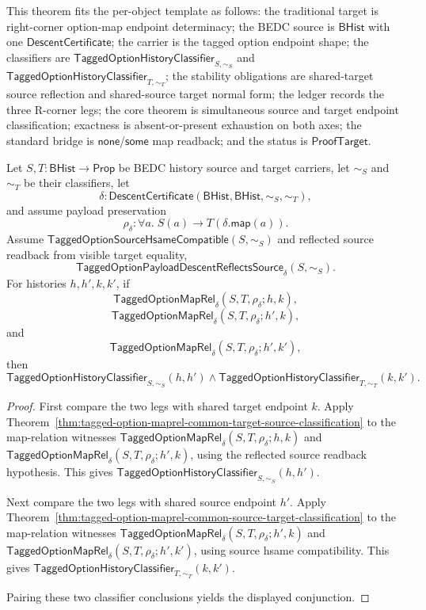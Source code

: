 \begin{theorem}
\label{thm:tagged-option-maprel-r-corner-classifier-coherence}
This theorem fits the per-object template as follows: the traditional target is
right-corner option-map endpoint determinacy; the BEDC source is
$\mathsf{BHist}$ with one $\mathsf{DescentCertificate}$; the carrier is the
tagged option endpoint shape; the classifiers are
$\mathsf{TaggedOptionHistoryClassifier}_{S,\sim_S}$ and
$\mathsf{TaggedOptionHistoryClassifier}_{T,\sim_T}$; the stability obligations
are shared-target source reflection and shared-source target normal form; the
ledger records the three R-corner legs; the core theorem is simultaneous source
and target endpoint classification; exactness is absent-or-present exhaustion on
both axes; the standard bridge is $\mathsf{none}$/$\mathsf{some}$ map readback;
and the status is $\mathsf{ProofTarget}$.

Let $S,T:\mathsf{BHist}\to\mathsf{Prop}$ be BEDC history source and target
carriers, let $\sim_S$ and $\sim_T$ be their classifiers, let
$$
\delta:\mathsf{DescentCertificate}(\mathsf{BHist},\mathsf{BHist},\sim_S,\sim_T),
$$
and assume payload preservation
$$
\rho_{\delta}:\forall a.\;S(a)\to T(\delta.\mathsf{map}(a)).
$$
Assume $\mathsf{TaggedOptionSourceHsameCompatible}(S,\sim_S)$ and reflected
source readback from visible target equality,
$$
\mathsf{TaggedOptionPayloadDescentReflectsSource}_{\delta}(S,\sim_S).
$$
For histories $h,h',k,k'$, if
$$
\mathsf{TaggedOptionMapRel}_{\delta}(S,T,\rho_{\delta};h,k),
$$
$$
\mathsf{TaggedOptionMapRel}_{\delta}(S,T,\rho_{\delta};h',k),
$$
and
$$
\mathsf{TaggedOptionMapRel}_{\delta}(S,T,\rho_{\delta};h',k'),
$$
then
$$
\mathsf{TaggedOptionHistoryClassifier}_{S,\sim_S}(h,h')
\land
\mathsf{TaggedOptionHistoryClassifier}_{T,\sim_T}(k,k').
$$
\end{theorem}
\begin{proof}
First compare the two legs with shared target endpoint $k$. Apply
Theorem~\ref{thm:tagged-option-maprel-common-target-source-classification} to
the map-relation witnesses
$\mathsf{TaggedOptionMapRel}_{\delta}(S,T,\rho_{\delta};h,k)$ and
$\mathsf{TaggedOptionMapRel}_{\delta}(S,T,\rho_{\delta};h',k)$, using the
reflected source readback hypothesis. This gives
$\mathsf{TaggedOptionHistoryClassifier}_{S,\sim_S}(h,h')$.

Next compare the two legs with shared source endpoint $h'$. Apply
Theorem~\ref{thm:tagged-option-maprel-common-source-target-classification} to
the map-relation witnesses
$\mathsf{TaggedOptionMapRel}_{\delta}(S,T,\rho_{\delta};h',k)$ and
$\mathsf{TaggedOptionMapRel}_{\delta}(S,T,\rho_{\delta};h',k')$, using source
hsame compatibility. This gives
$\mathsf{TaggedOptionHistoryClassifier}_{T,\sim_T}(k,k')$.

Pairing these two classifier conclusions yields the displayed conjunction.
\end{proof}

